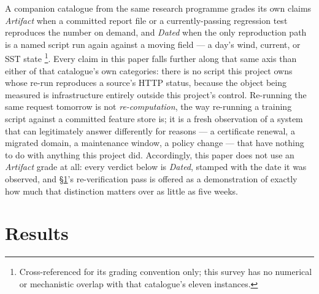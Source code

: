  A companion
catalogue from the same research programme grades its own claims
\emph{Artifact} when a committed report file or a currently-passing
regression test reproduces the number on demand, and \emph{Dated} when the
only reproduction path is a named script run again against a moving
field --- a day's wind, current, or SST state
\citep{silentfailures2026}\footnote{Cross-referenced for its grading
convention only; this survey has no numerical or mechanistic overlap with
that catalogue's eleven instances.}. Every claim in this paper falls further
along that same axis than either of that catalogue's own categories: there is
no script this project owns whose re-run reproduces a source's HTTP status,
because the object being measured is infrastructure entirely outside this
project's control. Re-running the same request tomorrow is not
\emph{re-computation}, the way re-running a training script against a
committed feature store is; it is a fresh observation of a system that can
legitimately answer differently for reasons --- a certificate renewal, a
migrated domain, a maintenance window, a policy change --- that have nothing
to do with anything this project did. Accordingly, this paper does not use an
\emph{Artifact} grade at all: every verdict below is \emph{Dated}, stamped
with the date it was observed, and \S\ref{sec:results}'s re-verification
pass is offered as a demonstration of exactly how much that distinction
matters over as little as five weeks.

\section{Results}
\label{sec:results}

